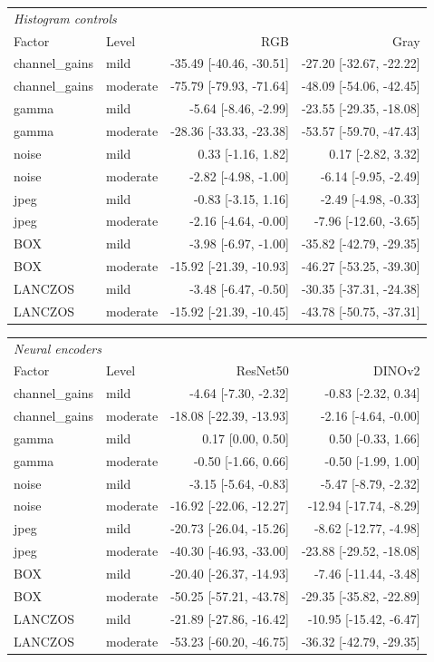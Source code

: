 \begin{tabular}{llrr}\toprule
\multicolumn{4}{l}{\textit{Histogram controls}}\\
Factor & Level & RGB & Gray \\\midrule
channel\_gains & mild & -35.49 [-40.46, -30.51] & -27.20 [-32.67, -22.22] \\
channel\_gains & moderate & -75.79 [-79.93, -71.64] & -48.09 [-54.06, -42.45] \\
gamma & mild & -5.64 [-8.46, -2.99] & -23.55 [-29.35, -18.08] \\
gamma & moderate & -28.36 [-33.33, -23.38] & -53.57 [-59.70, -47.43] \\
noise & mild & 0.33 [-1.16, 1.82] & 0.17 [-2.82, 3.32] \\
noise & moderate & -2.82 [-4.98, -1.00] & -6.14 [-9.95, -2.49] \\
jpeg & mild & -0.83 [-3.15, 1.16] & -2.49 [-4.98, -0.33] \\
jpeg & moderate & -2.16 [-4.64, -0.00] & -7.96 [-12.60, -3.65] \\
BOX & mild & -3.98 [-6.97, -1.00] & -35.82 [-42.79, -29.35] \\
BOX & moderate & -15.92 [-21.39, -10.93] & -46.27 [-53.25, -39.30] \\
LANCZOS & mild & -3.48 [-6.47, -0.50] & -30.35 [-37.31, -24.38] \\
LANCZOS & moderate & -15.92 [-21.39, -10.45] & -43.78 [-50.75, -37.31] \\
\bottomrule\end{tabular}
\par\vspace{8pt}
\begin{tabular}{llrr}\toprule
\multicolumn{4}{l}{\textit{Neural encoders}}\\
Factor & Level & ResNet50 & DINOv2 \\\midrule
channel\_gains & mild & -4.64 [-7.30, -2.32] & -0.83 [-2.32, 0.34] \\
channel\_gains & moderate & -18.08 [-22.39, -13.93] & -2.16 [-4.64, -0.00] \\
gamma & mild & 0.17 [0.00, 0.50] & 0.50 [-0.33, 1.66] \\
gamma & moderate & -0.50 [-1.66, 0.66] & -0.50 [-1.99, 1.00] \\
noise & mild & -3.15 [-5.64, -0.83] & -5.47 [-8.79, -2.32] \\
noise & moderate & -16.92 [-22.06, -12.27] & -12.94 [-17.74, -8.29] \\
jpeg & mild & -20.73 [-26.04, -15.26] & -8.62 [-12.77, -4.98] \\
jpeg & moderate & -40.30 [-46.93, -33.00] & -23.88 [-29.52, -18.08] \\
BOX & mild & -20.40 [-26.37, -14.93] & -7.46 [-11.44, -3.48] \\
BOX & moderate & -50.25 [-57.21, -43.78] & -29.35 [-35.82, -22.89] \\
LANCZOS & mild & -21.89 [-27.86, -16.42] & -10.95 [-15.42, -6.47] \\
LANCZOS & moderate & -53.23 [-60.20, -46.75] & -36.32 [-42.79, -29.35] \\
\bottomrule\end{tabular}
\par\vspace{8pt}
